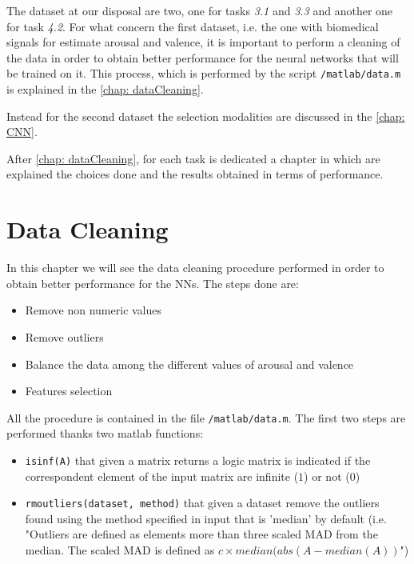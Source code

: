 \documentclass[a4paper]{report}
\begin{document}
	\noindent The dataset at our disposal are two, one for tasks \textit{3.1} and \textit{3.3} and another one for task \textit{4.2}.
	\noindent For what concern the first dataset, i.e. the one with biomedical signals for estimate arousal and valence, it is important to perform a cleaning of the data in order to obtain better performance for the neural networks that will be trained on it. This process, which is performed by the script \texttt{/matlab/data.m} is explained in the \autoref{chap: dataCleaning}. 
	
	\noindent Instead for the second dataset the selection modalities are discussed in the \autoref{chap: CNN}.
	
	\noindent After \autoref{chap: dataCleaning}, for each task is dedicated a chapter in which are explained the choices done and the results obtained in terms of performance.
	
\chapter{Data Cleaning}
	\label{chap: dataCleaning}
	\noindent In this chapter we will see the data cleaning procedure performed in order to obtain better performance for the NNs. The steps done are:
	\begin{itemize}
		\item Remove non numeric values
		\item Remove outliers
		\item Balance the data among the different values of arousal and valence
		\item Features selection
	\end{itemize}
	\noindent All the procedure is contained in the file \texttt{/matlab/data.m}. The first two steps are performed thanks two matlab functions:
	\begin{itemize}
		\item \texttt{isinf(A)} that given a matrix returns a logic matrix is indicated if the correspondent element of the input matrix are infinite ($1$) or not ($0$) 
		
		\item \texttt{rmoutliers(dataset, method)} that given a dataset remove the outliers found using the method specified in input that is 'median' by default (i.e. "Outliers are defined as elements more than three scaled MAD from the median. The scaled MAD is defined as $c\times median(abs(A-median(A))$")
	\end{itemize} 
	
\end{document}
